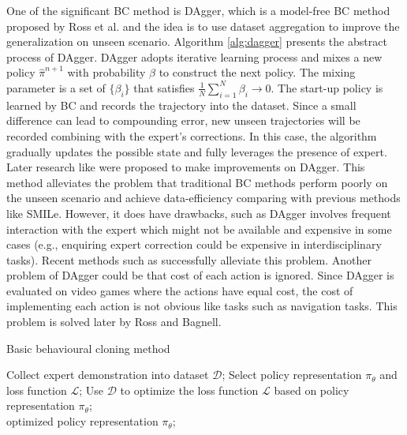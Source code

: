 \documentclass[acmsmall]{acmart}
\begin{document}
One of the significant BC method is DAgger, which is a model-free BC method proposed by Ross et al.\cite{rossReductionImitationLearning2011} and the idea is to use dataset aggregation to improve the generalization on unseen scenario. Algorithm \ref{alg:dagger} presents the abstract process of DAgger. DAgger adopts iterative learning process and mixes a new policy $\hat{\pi}^{n+1}$ with probability $\beta$ to construct the next policy. The mixing parameter is a set of $\{\beta_i\}$ that satisfies $\frac{1}{N}\sum_{i=1}^{N}\beta_{i} \rightarrow 0$.  
The start-up policy is learned by BC and records the trajectory into the dataset. Since a small difference can lead to compounding error, new unseen trajectories will be recorded combining with the expert's corrections. In this case, the algorithm gradually updates the possible state and fully leverages the presence of expert. Later research like\cite{rossReinforcementImitationLearning2014,sunDeeplyAggreVaTeDDifferentiable2017,liu2020imitationcache,hussein2021robust,wang2021minimizing,tu2021closing} were proposed to make improvements on DAgger.
This method alleviates the problem that traditional BC methods perform poorly on the unseen scenario and achieve data-efficiency comparing with previous methods like SMILe\cite{rossEfficientReductionsImitation2010}. However, it does have drawbacks, such as DAgger involves frequent interaction with the expert which might not be available and expensive in some cases (e.g., enquiring expert correction could be expensive in interdisciplinary tasks). Recent methods such as\cite{hoGenerativeAdversarialImitation2016,chenLearningCheating2019} successfully alleviate this problem. Another problem of DAgger could be that cost of each action is ignored. Since DAgger is evaluated on video games where the actions have equal cost, the cost of implementing each action is not obvious like tasks such as navigation tasks. This problem is solved later by Ross and Bagnell\cite{rossReinforcementImitationLearning2014}. 
\begin{algorithm}[t]
  \caption{Basic behavioural cloning method}
  \label{alg:BC}
  \begin{algorithmic}[1]
    \State Collect expert demonstration into dataset $\mathcal{D}$;
    \State Select policy representation $\pi_\theta$ and loss function $\mathcal{L}$;
    \State Use $\mathcal{D}$ to optimize the loss function $\mathcal{L}$ based on policy representation $\pi_\theta$;\\
    \Return optimized policy representation $\pi_\theta$;
  \end{algorithmic}
\end{algorithm}
\end{document}

